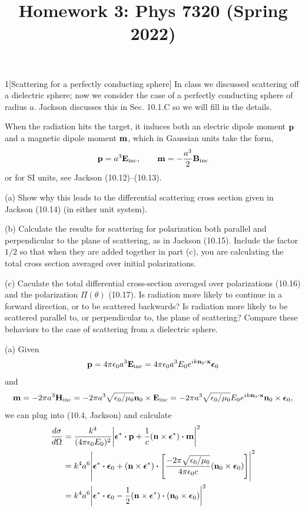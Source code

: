 \documentclass[12pt]{article}
\title{Homework 3: Phys 7320 (Spring 2022)}
\begin{document}
\maketitle
\begin{problem}{1}[Scattering for a perfectly conducting sphere]
In class we discussed scattering off a dielectric sphere; now we consider the
case of a perfectly conducting sphere of radius $a$. Jackson discusses this in
Sec. 10.1.C so we will fill in the details.

When the radiation hits the target, it induces both an electric dipole moment
$\vb{p}$ and a magnetic dipole moment $\vb{m}$, which in Gaussian units take the
form,
\begin{equation}
    \vb{p}=a^3\vb{E}_\text{inc},\qquad
    \vb{m}=-\frac{a^3}{2}\vb{B}_\text{inc}
\end{equation}
or for SI units, see Jackson (10.12)--(10.13).

(a) Show why this leads to the differential scattering cross section given in
Jackson (10.14) (in either unit system).

(b) Calculate the results for scattering for polarization both parallel and
perpendicular to the plane of scattering, as in Jackson (10.15). Include the
factor $1/2$ so that when they are added together in part (c), you are
calculating the total cross section averaged over initial polarizations.

(c) Caculate the total differential cross-section averaged over polarizations
(10.16) and the polarization $\Pi(\theta)$ (10.17). Is radiation more likely to
continue in a forward direction, or to be scattered backwards? Is radiation more
likely to be scattered parallel to, or perpendicular to, the plane of
scattering? Compare these behaviors to the case of scattering from a
dielectric sphere.
\begin{solution}
(a) Given
\begin{equation}
    \vb{p}
    =4\pi\epsilon_0a^3\vb{E}_\text{inc}
    =4\pi\epsilon_0a^3E_0e^{ik\vb{n}_0\vdot\vb{x}}\bm\epsilon_0 
\end{equation}
and
\begin{equation}
    \vb{m}
    =-2\pi a^3\vb{H}_\text{inc}
    =-2\pi a^3\sqrt{\epsilon_0/\mu_0}\vb{n}_0\times\vb{E}_\text{inc}  
    =-2\pi a^3\sqrt{\epsilon_0/\mu_0}E_0e^{ik\vb{n}_0\vdot\vb{x}}\vb{n}_0\times
    \bm\epsilon_0,
\end{equation}
we can plug into (10.4, Jackson) and calculate
\begin{align}
    \frac{d\sigma}{d\Omega}
    &=\frac{k^4}{(4\pi\epsilon_0 E_0)^2}
    \abs{\bm\epsilon^\ast\vdot\vb{p}+\frac1c(\vb{n}\times\bm\epsilon^\ast)\vdot\vb{m}}^2\notag\\
    &=k^4a^6\abs{\bm\epsilon^\ast\vdot\bm\epsilon_0
    +\qty(\vb{n}\times\bm\epsilon^\ast)\vdot\qty[\frac{-2\pi\sqrt{\epsilon_0/\mu_0}}{4\pi\epsilon_0c}(\vb{n}_0\times\bm\epsilon_0)]}^2\notag\\
    &=k^4a^6\abs{\bm\epsilon^\ast\vdot\bm\epsilon_0
    -\frac12\qty(\vb{n}\times\bm\epsilon^\ast)\vdot\qty(\vb{n}_0\times\bm\epsilon_0)}^2
\end{align}


\end{solution}
\end{problem}
\end{document}
